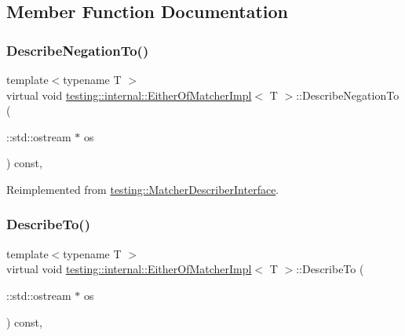 \subsection{Member Function Documentation}
\mbox{\label{classtesting_1_1internal_1_1_either_of_matcher_impl_ab5a4eac981acde377a4fd344507b1d71}} 
\subsubsection{\texorpdfstring{Describe\+Negation\+To()}{DescribeNegationTo()}}
{\footnotesize\ttfamily template$<$typename T $>$ \\
virtual void \hyperlink{classtesting_1_1internal_1_1_either_of_matcher_impl}{testing\+::internal\+::\+Either\+Of\+Matcher\+Impl}$<$ T $>$\+::Describe\+Negation\+To (\begin{DoxyParamCaption}\item[{\+::std\+::ostream $\ast$}]{os }\end{DoxyParamCaption}) const\hspace{0.3cm}{\ttfamily [inline]}, {\ttfamily [virtual]}}



Reimplemented from \hyperlink{classtesting_1_1_matcher_describer_interface_a2071afbc47097c4d1c0064275af34db0}{testing\+::\+Matcher\+Describer\+Interface}.

\mbox{\label{classtesting_1_1internal_1_1_either_of_matcher_impl_a0389690d0ce06a1ca447db6281a380d3}} 
\subsubsection{\texorpdfstring{Describe\+To()}{DescribeTo()}}
{\footnotesize\ttfamily template$<$typename T $>$ \\
virtual void \hyperlink{classtesting_1_1internal_1_1_either_of_matcher_impl}{testing\+::internal\+::\+Either\+Of\+Matcher\+Impl}$<$ T $>$\+::Describe\+To (\begin{DoxyParamCaption}\item[{\+::std\+::ostream $\ast$}]{os }\end{DoxyParamCaption}) const\hspace{0.3cm}{\ttfamily [inline]}, {\ttfamily [virtual]}}



